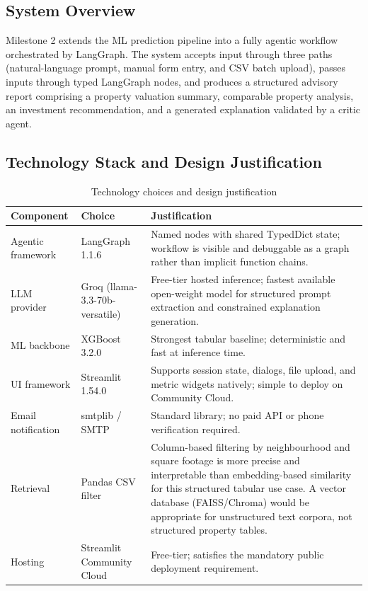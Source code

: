 \documentclass[12pt,a4paper]{article}
\begin{document}
\subsection{System Overview}

Milestone 2 extends the ML prediction pipeline into a fully agentic workflow orchestrated by LangGraph. The system accepts input through three paths (natural-language prompt, manual form entry, and CSV batch upload), passes inputs through typed LangGraph nodes, and produces a structured advisory report comprising a property valuation summary, comparable property analysis, an investment recommendation, and a generated explanation validated by a critic agent.

\subsection{Technology Stack and Design Justification}

\begin{table}[H]
\centering
\caption{Technology choices and design justification}
\renewcommand{\arraystretch}{1.3}
\begin{tabularx}{\textwidth}{p{3.2cm}p{3.8cm}X}
\toprule
\textbf{Component} & \textbf{Choice} & \textbf{Justification} \\
\midrule
Agentic framework   & LangGraph 1.1.6            & Named nodes with shared TypedDict state; workflow is visible and debuggable as a graph rather than implicit function chains. \\
LLM provider        & Groq (llama-3.3-70b-versatile) & Free-tier hosted inference; fastest available open-weight model for structured prompt extraction and constrained explanation generation. \\
ML backbone         & XGBoost 3.2.0              & Strongest tabular baseline; deterministic and fast at inference time. \\
UI framework        & Streamlit 1.54.0           & Supports session state, dialogs, file upload, and metric widgets natively; simple to deploy on Community Cloud. \\
Email notification  & smtplib / SMTP             & Standard library; no paid API or phone verification required. \\
Retrieval           & Pandas CSV filter          & Column-based filtering by neighbourhood and square footage is more precise and interpretable than embedding-based similarity for this structured tabular use case. A vector database (FAISS/Chroma) would be appropriate for unstructured text corpora, not structured property tables. \\
Hosting             & Streamlit Community Cloud  & Free-tier; satisfies the mandatory public deployment requirement. \\
\bottomrule
\end{tabularx}
\end{table}
\end{document}
